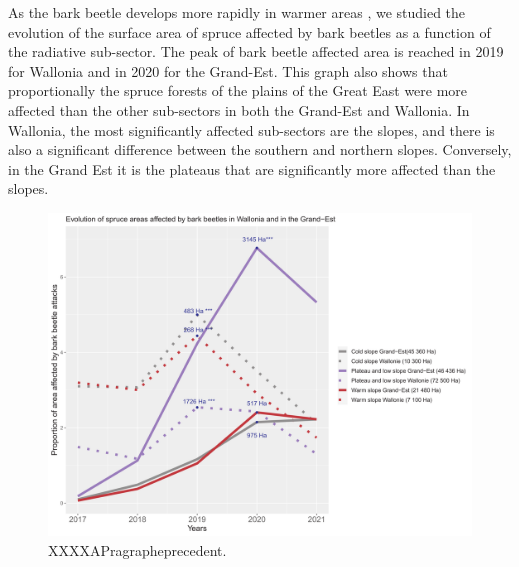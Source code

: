 \documentclass[3p,procedia]{elsarticle}
\begin{document}
 


 As the bark beetle develops more rapidly in warmer areas \citep{annila_influence_1969}, we studied the evolution of the surface area of spruce affected by bark beetles as a function of the radiative sub-sector.
The peak of bark beetle affected area is reached in 2019 for Wallonia and in 2020 for the Grand-Est.
This graph also shows that proportionally the spruce forests of the plains of the Great East were more affected than the other sub-sectors in both the Grand-Est and Wallonia. In Wallonia, the most significantly affected sub-sectors are the slopes, and there is also a significant difference between the southern and northern slopes. 
 Conversely, in the Grand Est it is the plateaus that are significantly more affected than the slopes.
\begin{figure}
\centering
	\includegraphics[width=\textwidth]{evol_ss_GDE_wall.png}
     \caption{XXXXAPragrapheprecedent.}
	\label{ss_sco}
\end{figure}

	
\end{document}
